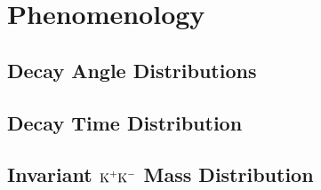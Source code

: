 \chapter{Phenomenology}



\section{Decay Angle Distributions}
\section{Decay Time Distribution}
\section{Invariant $\text{K}^+\text{K}^-$ Mass Distribution}

